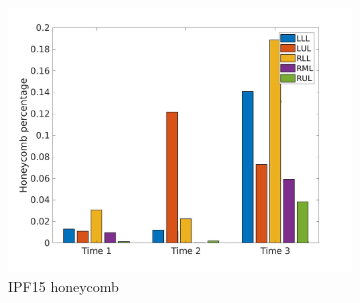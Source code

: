 \begin{figure}[H]
\begin{subfigure}{.46\linewidth}
  \includegraphics[width=\linewidth,trim={{.0\wd0} {.0\wd0} {.0\wd0} {.0\wd0}},clip]{Appendix/Image_AppexA/LobarDistribution/IPF15HoneycombLobarRegionDiseaseDistributionOverTime.jpg} %
  \caption{IPF15 honeycomb}
  \label{fig:IPF15LobarRegionDiseaseDistributionOverTime-c} 
\end{subfigure} 
\hspace{.3in}
\begin{subfigure}{.46\linewidth}%

\end{subfigure}
\end{figure}
